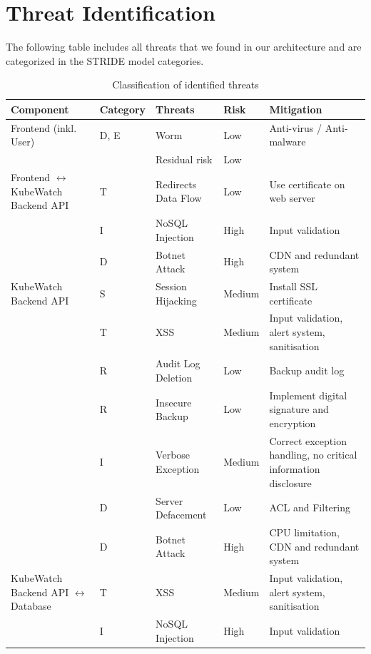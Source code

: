 \section{Threat Identification}
The following table includes all threats that we found in our architecture and are categorized in the STRIDE model categories.
\begin{longtable}[h!]{p{2.1cm} p{1.8cm} p{3cm} p{2cm} p{3.5cm}}
    \textbf{Component} & \textbf{Category} & \textbf{Threats} & \textbf{Risk} & \textbf{Mitigation} \\ \hline
    \endhead
    \caption{\label{tab:threats-classification}Classification of identified threats}
    \endlastfoot
    Frontend (inkl. User)              
                        & D, E & Worm & Low & Anti-virus / Anti-malware\\
                        & & Residual risk & Low & \\
    \hline
    Frontend  \(\leftrightarrow\) KubeWatch Backend API
                        & T & Redirects Data Flow & Low & Use certificate on web server \\
                        & I & NoSQL Injection & High & Input validation \\
                        & D & Botnet Attack & High & CDN and redundant system \\
    \hline
    KubeWatch Backend API
                        & S & Session Hijacking & Medium & Install SSL certificate \\
                        & T & XSS & Medium & Input validation, alert system, sanitisation \\
                        & R & Audit Log Deletion & Low & Backup audit log \\
                        & R & Insecure Backup & Low & Implement digital signature and encryption \\
                        & I & Verbose Exception & Medium & Correct exception handling, no critical information disclosure \\
                        & D & Server Defacement & Low & ACL and Filtering \\
                        & D & Botnet Attack & High & CPU limitation, CDN and redundant system \\
    \hline
    KubeWatch Backend API \(\leftrightarrow\) Database
                        & T & XSS & Medium & Input validation, alert system, sanitisation \\
                        & I & NoSQL Injection & High & Input validation \\

\end{longtable}
